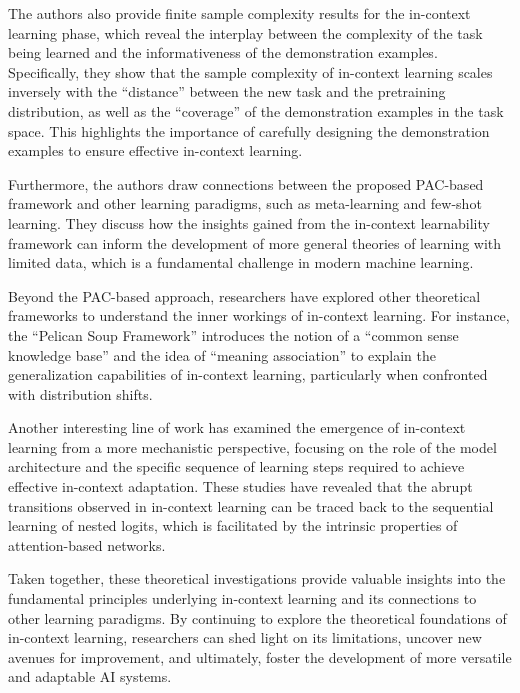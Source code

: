 \documentclass[11pt]{article}
\begin{document}
The authors also provide finite sample complexity results for the in-context learning phase, which reveal the interplay between the complexity of the task being learned and the informativeness of the demonstration examples. Specifically, they show that the sample complexity of in-context learning scales inversely with the ``distance'' between the new task and the pretraining distribution, as well as the ``coverage'' of the demonstration examples in the task space. This highlights the importance of carefully designing the demonstration examples to ensure effective in-context learning.

Furthermore, the authors draw connections between the proposed PAC-based framework and other learning paradigms, such as meta-learning and few-shot learning. They discuss how the insights gained from the in-context learnability framework can inform the development of more general theories of learning with limited data, which is a fundamental challenge in modern machine learning.

Beyond the PAC-based approach, researchers have explored other theoretical frameworks to understand the inner workings of in-context learning. For instance, the ``Pelican Soup Framework'' \cite{ref107} introduces the notion of a ``common sense knowledge base'' and the idea of ``meaning association'' to explain the generalization capabilities of in-context learning, particularly when confronted with distribution shifts.

Another interesting line of work \cite{ref38} has examined the emergence of in-context learning from a more mechanistic perspective, focusing on the role of the model architecture and the specific sequence of learning steps required to achieve effective in-context adaptation. These studies have revealed that the abrupt transitions observed in in-context learning can be traced back to the sequential learning of nested logits, which is facilitated by the intrinsic properties of attention-based networks.

Taken together, these theoretical investigations provide valuable insights into the fundamental principles underlying in-context learning and its connections to other learning paradigms. By continuing to explore the theoretical foundations of in-context learning, researchers can shed light on its limitations, uncover new avenues for improvement, and ultimately, foster the development of more versatile and adaptable AI systems.
\end{document}
